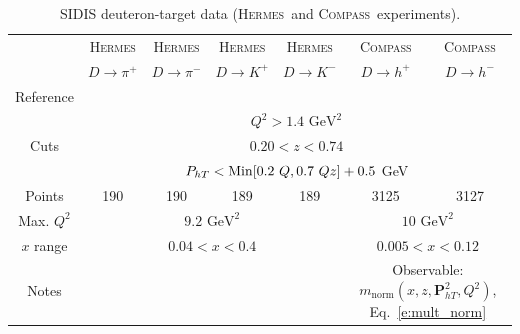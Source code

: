 \documentclass[aps,preprintnumbers,showpacs,nofootinbib,superscriptaddress,floatfix]{revtex4}
\newcommand{\hermes}{\textsc{Hermes}}
\newcommand{\compass}{\textsc{Compass}}
\newcommand{\Tperp}{T}
\begin{document}
\begin{table}[h!]
\begin{center}
\begin{tabular}{|c|c|c|c|c|c|c|}
 \hline
  & \hermes & \hermes & \hermes & \hermes & \compass & \compass\\
 ~          &  $D \to \pi^+$    &   $D \to \pi^-$    &  $D \to K^+$    &   $D \to K^-$      &  $D \to h^+$    &   $D \to h^-$            \\
 \hline
 Reference & \multicolumn{4}{c|}{\cite{Airapetian:2012ki}}        &\multicolumn{2}{c|}{\cite{Adolph:2013stb}} \\
\hline
\multirow{3}{*}{Cuts}             & \multicolumn{6}{c|}{$Q^2 > 1.4 \text{ GeV}^2$}     \\
             & \multicolumn{6}{c|}{$0.20 <z <0.74$}     \\
             & \multicolumn{6}{c|}{$P_{h \Tperp}< {\rm Min}[0.2\ Q, 0.7 \ Q z ] +0.5$ GeV}     \\
\hline
 Points         &  190 & 190 & 189 & 189   & 3125 & 3127   \\
 \hline
Max. $Q^2$      &  \multicolumn{4}{c|}{$9.2 \text{ GeV}^2 $}      & \multicolumn{2}{c|}{$10 \text{ GeV}^2 $}             \\
 \hline
$x$ range       & \multicolumn{4}{c|}{$0.04 < x < 0.4$ }    &  \multicolumn{2}{c|}{$0.005 < x < 0.12$ }             \\
\hline
Notes         &\multicolumn{4}{c|}{ }   & \multicolumn{2}{c|}{Observable: $\displaystyle m_{\text{norm}}(x,z,\bm{P}_{h\Tperp}^2, Q^2)$, Eq.~\eqref{e:mult_norm}}  \\
\hline 
\end{tabular}
\caption{SIDIS deuteron-target data (\hermes\ and \compass\ experiments).}
\label{t:data_SIDIS_deuteron}
\end{center}
\end{table}
\end{document}
